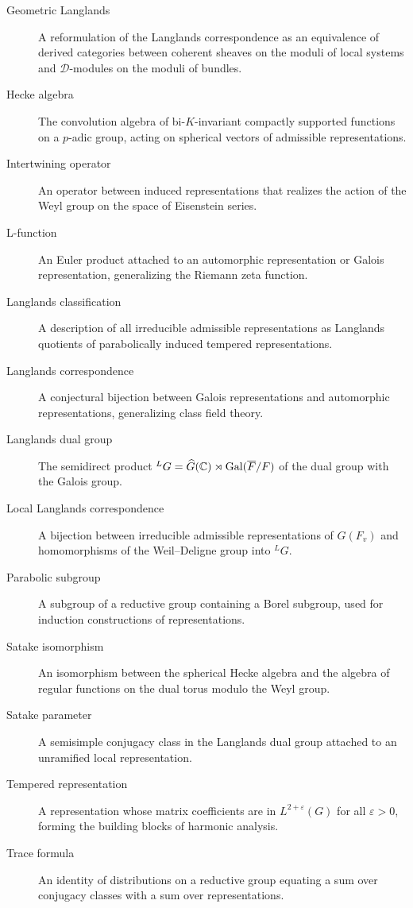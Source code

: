 \begin{description}
\item[Geometric Langlands] A reformulation of the Langlands correspondence as an equivalence of derived categories between coherent sheaves on the moduli of local systems and \(\mathcal{D}\)-modules on the moduli of bundles.
\item[Hecke algebra] The convolution algebra of bi-\(K\)-invariant compactly supported functions on a \(p\)-adic group, acting on spherical vectors of admissible representations.
\item[Intertwining operator] An operator between induced representations that realizes the action of the Weyl group on the space of Eisenstein series.
\item[L-function] An Euler product attached to an automorphic representation or Galois representation, generalizing the Riemann zeta function.
\item[Langlands classification] A description of all irreducible admissible representations as Langlands quotients of parabolically induced tempered representations.
\item[Langlands correspondence] A conjectural bijection between Galois representations and automorphic representations, generalizing class field theory.
\item[Langlands dual group] The semidirect product \({}^L G = \widehat{G}(\mathbb{C}) \rtimes \operatorname{Gal}(\overline{F}/F)\) of the dual group with the Galois group.
\item[Local Langlands correspondence] A bijection between irreducible admissible representations of \(G(F_v)\) and homomorphisms of the Weil--Deligne group into \({}^L G\).
\item[Parabolic subgroup] A subgroup of a reductive group containing a Borel subgroup, used for induction constructions of representations.
\item[Satake isomorphism] An isomorphism between the spherical Hecke algebra and the algebra of regular functions on the dual torus modulo the Weyl group.
\item[Satake parameter] A semisimple conjugacy class in the Langlands dual group attached to an unramified local representation.
\item[Tempered representation] A representation whose matrix coefficients are in \(L^{2+\varepsilon}(G)\) for all \(\varepsilon > 0\), forming the building blocks of harmonic analysis.
\item[Trace formula] An identity of distributions on a reductive group equating a sum over conjugacy classes with a sum over representations.

\end{description}
